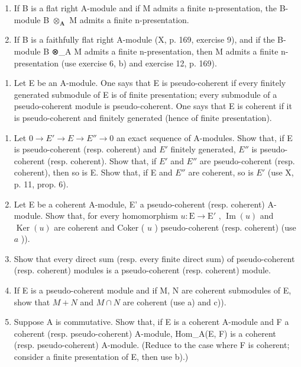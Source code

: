 \begin{enumerate}
\def\labelenumi{\alph{enumi})}
\item
  If B is a flat right A-module and if M admits a finite n-presentation, the B-module B \(\otimes_{\mathbf{A}}\) M admits a finite n-presentation.
\item
  If B is a faithfully flat right A-module (X, p. 169, exercise 9), and if the B-module B ⊗\_A M admits a finite n-presentation, then M admits a finite n-presentation (use exercise 6, b) and exercise 12, p. 169).
\end{enumerate}

\begin{enumerate}
\def\labelenumi{\arabic{enumi})}
\setcounter{enumi}{9}
\tightlist
\item
  Let E be an A-module. One says that E is pseudo-coherent if every finitely generated submodule of E is of finite presentation; every submodule of a pseudo-coherent module is pseudo-coherent. One says that E is coherent if it is pseudo-coherent and finitely generated (hence of finite presentation).
\end{enumerate}

\begin{enumerate}
\def\labelenumi{\alph{enumi})}
\item
  Let \(0 \to E' \to E \to E'' \to 0\) an exact sequence of A-modules. Show that, if E is pseudo-coherent (resp. coherent) and \(E'\) finitely generated, \(E''\) is pseudo-coherent (resp. coherent). Show that, if \(E'\) and \(E''\) are pseudo-coherent (resp. coherent), then so is E. Show that, if E and \(E''\) are coherent, so is \(E'\) (use X, p. 11, prop. 6).
\item
  Let E be a coherent A-module, E' a pseudo-coherent (resp. coherent) A-module. Show that, for every homomorphism \(u: \mathrm{E} \to \mathrm{E}'\) , \(\operatorname{Im}(u)\) and \(\operatorname{Ker}(u)\) are coherent and Coker ( \(u\) ) pseudo-coherent (resp. coherent) (use \(a\) )).
\item
  Show that every direct sum (resp. every finite direct sum) of pseudo-coherent (resp. coherent) modules is a pseudo-coherent (resp. coherent) module.
\item
  If E is a pseudo-coherent module and if M, N are coherent submodules of E, show that \(M + N\) and \(M \cap N\) are coherent (use a) and c)).
\item
  Suppose A is commutative. Show that, if E is a coherent A-module and F a coherent (resp. pseudo-coherent) A-module, Hom\_A(E, F) is a coherent (resp. pseudo-coherent) A-module. (Reduce to the case where F is coherent; consider a finite presentation of E, then use b).)
\end{enumerate}

